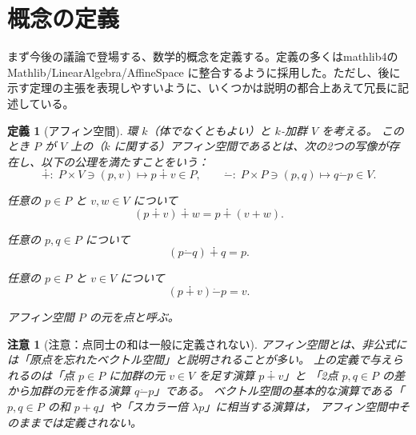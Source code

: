 \documentclass[a4paper,12pt]{bxjsbook}
\newlength{\customindent}
\newenvironment{body}{
  \par
  \begingroup
  \setlength{\leftskip}{\customindent}
  \setlength{\rightskip}{0pt}
  \setlength{\parindent}{1em}
  \setlength{\displayindent}{\customindent}
  \setlength{\displaywidth}{\dimexpr\linewidth-\customindent\relax}
}{
  \par
  \endgroup
}
\theoremstyle{theorem}
\newtheorem{definition}[theorem]{定義}
\newtheorem{remark}[theorem]{注意}
\newcommand{\dotminus}{\mathbin{\dot{-}}}
\begin{document}
    \section{概念の定義}
    \begin{body}
        \indent まず今後の議論で登場する、数学的概念を定義する。定義の多くはmathlib4の Mathlib/LinearAlgebra/AffineSpace に整合するように採用した。ただし、後に示す定理の主張を表現しやすいように、いくつかは説明の都合上あえて冗長に記述している。
    \end{body}

    \begin{definition}[アフィン空間]
        環 $k$（体でなくともよい）と $k$-加群 $V$ を考える。
        このとき $P$ が $V$ 上の（$k$ に関する）\emph{アフィン空間}であるとは、次の2つの写像が存在し、以下の公理を満たすことをいう：
        \[
        \dotplus :\; P\times V \ni (p,v) \mapsto p \dotplus v \in P,
        \qquad
        \dotminus:\; P\times P \ni (p,q) \mapsto q \dotminus p \in V.
        \]
        \begin{theoremitemize}[leftmargin=5em, topsep=2pt, partopsep=0pt, itemsep=0pt, parsep=0pt]
            \item[\hspace*{5em}\textbf{公理1}] 任意の $p\in P$ と $v,w\in V$ について
            \[
            (p\dotplus v)\dotplus w = p\dotplus (v+w).
            \]
            \item[\hspace*{5em}\textbf{公理2}] 任意の $p,q\in P$ について
            \[
            (p\dotminus q)\dotplus q = p.
            \]
            \item[\hspace*{5em}\textbf{公理3}] 任意の $p\in P$ と $v\in V$ について
            \[
            (p\dotplus v)\dotminus p = v.
            \]
        \end{theoremitemize}
        アフィン空間 $P$ の元を\emph{点}と呼ぶ。
    \end{definition}

    \begin{remark}[注意：点同士の和は一般に定義されない]
        アフィン空間とは、非公式には「原点を忘れたベクトル空間」と説明されることが多い。
        上の定義で与えられるのは「点 $p\in P$ に加群の元 $v\in V$ を足す演算 $p\dotplus v$」と
        「2点 $p,q\in P$ の差から加群の元を作る演算 $q\dotminus p$」である。
        ベクトル空間の基本的な演算である「$p,q\in P$ の和 $p+q$」や「スカラー倍 $\lambda p$」に相当する演算は，
        アフィン空間中そのままでは定義されない。
    \end{remark}
\end{document}
